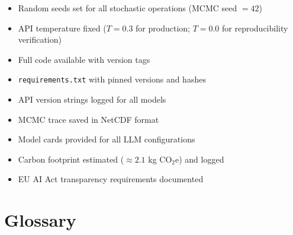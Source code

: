 \documentclass[10pt,letterpaper]{article}
\begin{document}
\begin{itemize}
  \item[$\checkmark$] Random seeds set for all stochastic operations (MCMC seed $= 42$)
  \item[$\checkmark$] API temperature fixed ($T = 0.3$ for production; $T = 0.0$ for reproducibility verification)
  \item[$\checkmark$] Full code available with version tags
  \item[$\checkmark$] \texttt{requirements.txt} with pinned versions and hashes
  \item[$\checkmark$] API version strings logged for all models
  \item[$\checkmark$] MCMC trace saved in NetCDF format
  \item[$\checkmark$] Model cards provided for all LLM configurations
  \item[$\checkmark$] Carbon footprint estimated ($\approx 2.1$ kg CO$_2$e) and logged
  \item[$\checkmark$] EU AI Act transparency requirements documented
\end{itemize}

\section{Glossary}
\label{app:glossary}
\end{document}
